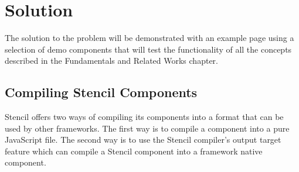 \chapter{Solution}
\label{cha:solution}
The solution to the problem will be demonstrated with an example page using a selection of demo components that will test the functionality of all the concepts described in the Fundamentals and Related Works chapter.
\section{Compiling Stencil Components}
Stencil offers two ways of compiling its components into a format that can be used by other frameworks. The first way is to compile a component into a pure JavaScript file. The second way is to use the Stencil compiler's output target feature which can compile a Stencil component into a framework native component.\\[0.5cm]

